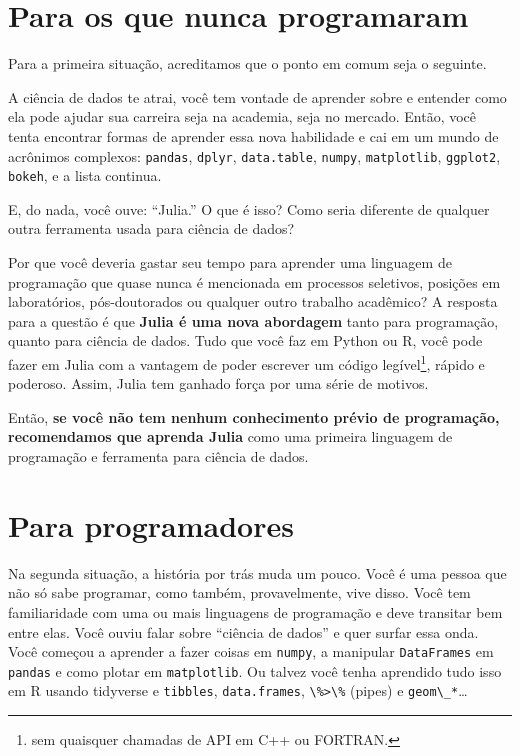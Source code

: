 \documentclass[
  notoc %
]{tufte-book}
\newcommand{\passthrough}[1]{#1}
\begin{document}
\hypertarget{sec:non-programmers}{%
\section{Para os que nunca programaram}\label{sec:non-programmers}}

Para a primeira situação, acreditamos que o ponto em comum seja o
seguinte.

A ciência de dados te atrai, você tem vontade de aprender sobre e
entender como ela pode ajudar sua carreira seja na academia, seja no
mercado. Então, você tenta encontrar formas de aprender essa nova
habilidade e cai em um mundo de acrônimos complexos:
\passthrough{\lstinline!pandas!}, \passthrough{\lstinline!dplyr!},
\passthrough{\lstinline!data.table!}, \passthrough{\lstinline!numpy!},
\passthrough{\lstinline!matplotlib!}, \passthrough{\lstinline!ggplot2!},
\passthrough{\lstinline!bokeh!}, e a lista continua.

E, do nada, você ouve: ``Julia.'' O que é isso? Como seria diferente de
qualquer outra ferramenta usada para ciência de dados?

Por que você deveria gastar seu tempo para aprender uma linguagem de
programação que quase nunca é mencionada em processos seletivos,
posições em laboratórios, pós-doutorados ou qualquer outro trabalho
acadêmico? A resposta para a questão é que \textbf{Julia é uma nova
abordagem} tanto para programação, quanto para ciência de dados. Tudo
que você faz em Python ou R, você pode fazer em Julia com a vantagem de
poder escrever um código legível\footnote{sem quaisquer chamadas de API
  em C++ ou FORTRAN.}, rápido e poderoso. Assim, Julia tem ganhado força
por uma série de motivos.

Então, \textbf{se você não tem nenhum conhecimento prévio de
programação, recomendamos que aprenda Julia} como uma primeira linguagem
de programação e ferramenta para ciência de dados.

\hypertarget{sec:programmers}{%
\section{Para programadores}\label{sec:programmers}}

Na segunda situação, a história por trás muda um pouco. Você é uma
pessoa que não só sabe programar, como também, provavelmente, vive
disso. Você tem familiaridade com uma ou mais linguagens de programação
e deve transitar bem entre elas. Você ouviu falar sobre ``ciência de
dados'' e quer surfar essa onda. Você começou a aprender a fazer coisas
em \passthrough{\lstinline!numpy!}, a manipular
\passthrough{\lstinline!DataFrames!} em \passthrough{\lstinline!pandas!}
e como plotar em \passthrough{\lstinline!matplotlib!}. Ou talvez você
tenha aprendido tudo isso em R usando tidyverse e
\passthrough{\lstinline!tibbles!},
\passthrough{\lstinline!data.frames!}, \passthrough{\lstinline!\%>\%!}
(pipes) e \passthrough{\lstinline!geom\_*!}\ldots{}
\end{document}
